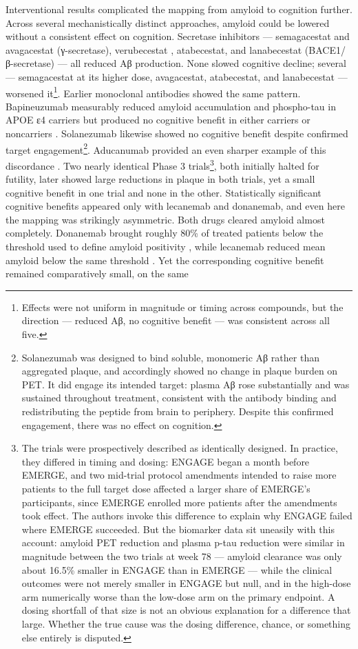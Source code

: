 \documentclass[twocolumn]{article} %
\begin{document}
Interventional results complicated the mapping from amyloid to cognition further. Across several mechanistically distinct approaches, amyloid could be lowered without a consistent effect on cognition. Secretase inhibitors \cite{panza2019bace} — semagacestat \cite{doody2013phase} and avagacestat (γ-secretase), verubecestat \cite{egan2018randomized}, atabecestat, and lanabecestat (BACE1/β-secretase) — all reduced Aβ production. None slowed cognitive decline; several — semagacestat at its higher dose, avagacestat, atabecestat, and lanabecestat — worsened it\footnote{Effects were not uniform in magnitude or timing across compounds, but the direction — reduced Aβ, no cognitive benefit — was consistent across all five.}. Earlier monoclonal antibodies showed the same pattern. Bapineuzumab measurably reduced amyloid accumulation and phospho-tau in APOE ε4 carriers but produced no cognitive benefit in either carriers or noncarriers \cite{salloway2014two}. Solanezumab \cite{doody2014phase} likewise showed no cognitive benefit despite confirmed target engagement\footnote{Solanezumab was designed to bind soluble, monomeric Aβ rather than aggregated plaque, and accordingly showed no change in plaque burden on PET. It did engage its intended target: plasma Aβ rose substantially and was sustained throughout treatment, consistent with the antibody binding and redistributing the peptide from brain to periphery. Despite this confirmed engagement, there was no effect on cognition.}. Aducanumab provided an even sharper example of this discordance \cite{budd2022two, lancet2022lecanemab}. Two nearly identical Phase 3 trials\footnote{The trials were prospectively described as identically designed. In practice, they differed in timing and dosing: ENGAGE began a month before EMERGE, and two mid-trial protocol amendments intended to raise more patients to the full target dose affected a larger share of EMERGE's participants, since EMERGE enrolled more patients after the amendments took effect. The authors invoke this difference to explain why ENGAGE failed where EMERGE succeeded. But the biomarker data sit uneasily with this account: amyloid PET reduction and plasma p-tau reduction were similar in magnitude between the two trials at week 78 — amyloid clearance was only about 16.5\% smaller in ENGAGE than in EMERGE — while the clinical outcomes were not merely smaller in ENGAGE but null, and in the high-dose arm numerically worse than the low-dose arm on the primary endpoint. A dosing shortfall of that size is not an obvious explanation for a difference that large. Whether the true cause was the dosing difference, chance, or something else entirely is disputed.}, both initially halted for futility, later showed large reductions in plaque in both trials, yet a small cognitive benefit in one trial and none in the other. Statistically significant cognitive benefits appeared only with lecanemab and donanemab, and even here the mapping was strikingly asymmetric. Both drugs cleared amyloid almost completely. Donanemab brought roughly 80\% of treated patients below the threshold used to define amyloid positivity \cite{sims2023donanemab}, while lecanemab reduced mean amyloid below the same threshold \cite{van2023lecanemab}. Yet the corresponding cognitive benefit remained comparatively small, on the same 
\end{document}
